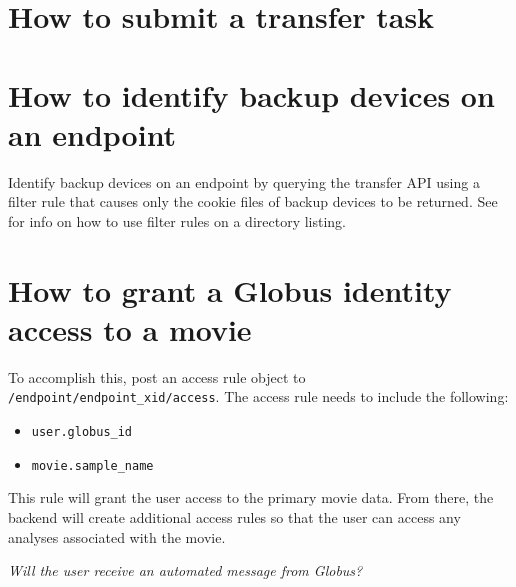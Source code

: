 
\section{How to submit a transfer task}


\section{How to identify backup devices on an endpoint\label{appendix:identifybackupdevices}}

Identify backup devices on an endpoint by querying the transfer API
using a filter rule that causes only the cookie files of backup devices
to be returned. See  for info
on how to use filter rules on a directory listing.

\section{How to grant a Globus identity access to a movie\label{appendix:grantingaccess}}

To accomplish this, post an access rule object to \texttt{/endpoint/endpoint\_xid/access}. The access rule 
needs to include the following:

\begin{itemize}
    \item \texttt{user.globus\_id}
    \item \texttt{movie.sample\_name}
\end{itemize}

This rule will grant the user access to the primary movie data. From there, the backend will 
create additional access rules so that the user can access any analyses associated with the 
movie.

\emph{Will the user receive an automated message from Globus?}

